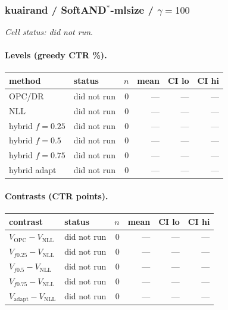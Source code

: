 \documentclass[10pt,a4paper]{article}
\begin{document}
\subsubsection{kuairand / SoftAND$^*$-mlsize / $\gamma=100$}
\emph{Cell status: did not run}.
\paragraph{Levels (greedy CTR \%).}
{\centering\small\begin{tabular}{llrrrr}
\toprule method & status & $n$ & mean & CI lo & CI hi \\
\midrule
OPC/DR & did not run & 0 & --- & --- & --- \\
NLL & did not run & 0 & --- & --- & --- \\
hybrid $f{=}0.25$ & did not run & 0 & --- & --- & --- \\
hybrid $f{=}0.5$ & did not run & 0 & --- & --- & --- \\
hybrid $f{=}0.75$ & did not run & 0 & --- & --- & --- \\
hybrid adapt & did not run & 0 & --- & --- & --- \\
\bottomrule\end{tabular}\par}
\paragraph{Contrasts (CTR points).}
{\centering\small\begin{tabular}{llrrrr}
\toprule contrast & status & $n$ & mean & CI lo & CI hi \\
\midrule
$V_{\mathrm{OPC}}-V_{\mathrm{NLL}}$ & did not run & 0 & --- & --- & --- \\
$V_{f0.25}-V_{\mathrm{NLL}}$ & did not run & 0 & --- & --- & --- \\
$V_{f0.5}-V_{\mathrm{NLL}}$ & did not run & 0 & --- & --- & --- \\
$V_{f0.75}-V_{\mathrm{NLL}}$ & did not run & 0 & --- & --- & --- \\
$V_{\mathrm{adapt}}-V_{\mathrm{NLL}}$ & did not run & 0 & --- & --- & --- \\
\bottomrule\end{tabular}\par}
\end{document}
